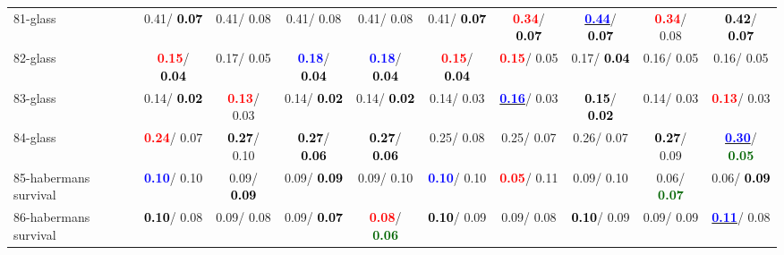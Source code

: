 \begin{table}[h]
\begin{center}
{\begin{tabular}{lc|c|c|c|c|c|c|c|c}
81-glass &   0.41/\textcolor{black}{\textbf{  0.07}} &   0.41/  0.08 &   0.41/  0.08 &   0.41/  0.08 &   0.41/\textcolor{black}{\textbf{  0.07}} & \textcolor{red}{\textbf{  0.34}}/\textcolor{black}{\textbf{  0.07}} & \underline{\textcolor{blue}{\textbf{  0.44}}}/\textcolor{black}{\textbf{  0.07}} & \textcolor{red}{\textbf{  0.34}}/  0.08 & \textcolor{black}{\textbf{  0.42}}/\textcolor{black}{\textbf{  0.07}} \\
82-glass & \textcolor{red}{\textbf{  0.15}}/\textcolor{black}{\textbf{  0.04}} &   0.17/  0.05 & \textcolor{blue}{\textbf{  0.18}}/\textcolor{black}{\textbf{  0.04}} & \textcolor{blue}{\textbf{  0.18}}/\textcolor{black}{\textbf{  0.04}} & \textcolor{red}{\textbf{  0.15}}/\textcolor{black}{\textbf{  0.04}} & \textcolor{red}{\textbf{  0.15}}/  0.05 &   0.17/\textcolor{black}{\textbf{  0.04}} &   0.16/  0.05 &   0.16/  0.05 \\
83-glass &   0.14/\textcolor{black}{\textbf{  0.02}} & \textcolor{red}{\textbf{  0.13}}/  0.03 &   0.14/\textcolor{black}{\textbf{  0.02}} &   0.14/\textcolor{black}{\textbf{  0.02}} &   0.14/  0.03 & \underline{\textcolor{blue}{\textbf{  0.16}}}/  0.03 & \textcolor{black}{\textbf{  0.15}}/\textcolor{black}{\textbf{  0.02}} &   0.14/  0.03 & \textcolor{red}{\textbf{  0.13}}/  0.03 \\
84-glass & \textcolor{red}{\textbf{  0.24}}/  0.07 & \textcolor{black}{\textbf{  0.27}}/  0.10 & \textcolor{black}{\textbf{  0.27}}/\textcolor{black}{\textbf{  0.06}} & \textcolor{black}{\textbf{  0.27}}/\textcolor{black}{\textbf{  0.06}} &   0.25/  0.08 &   0.25/  0.07 &   0.26/  0.07 & \textcolor{black}{\textbf{  0.27}}/  0.09 & \underline{\textcolor{blue}{\textbf{  0.30}}}/\textcolor{darkgreen}{\textbf{  0.05}} \\
85-habermans survival & \textcolor{blue}{\textbf{  0.10}}/  0.10 &   0.09/\textcolor{black}{\textbf{  0.09}} &   0.09/\textcolor{black}{\textbf{  0.09}} &   0.09/  0.10 & \textcolor{blue}{\textbf{  0.10}}/  0.10 & \textcolor{red}{\textbf{  0.05}}/  0.11 &   0.09/  0.10 &   0.06/\textcolor{darkgreen}{\textbf{  0.07}} &   0.06/\textcolor{black}{\textbf{  0.09}} \\ \hline
86-habermans survival & \textcolor{black}{\textbf{  0.10}}/  0.08 &   0.09/  0.08 &   0.09/\textcolor{black}{\textbf{  0.07}} & \textcolor{red}{\textbf{  0.08}}/\textcolor{darkgreen}{\textbf{  0.06}} & \textcolor{black}{\textbf{  0.10}}/  0.09 &   0.09/  0.08 & \textcolor{black}{\textbf{  0.10}}/  0.09 &   0.09/  0.09 & \underline{\textcolor{blue}{\textbf{  0.11}}}/  0.08 \\

\end{tabular}}
\end{center}
\end{table}
